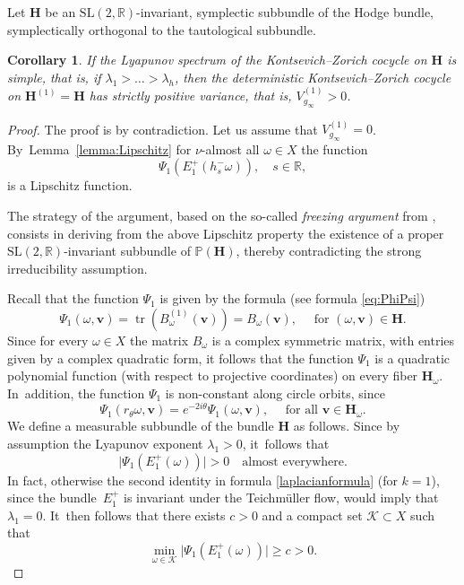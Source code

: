 \documentclass[10pt]{amsart}
\DeclareMathOperator{\tr}{tr}
\theoremstyle{plain}
\newtheorem{cor}[thm]{Corollary}
\theoremstyle{definition}
\numberwithin{equation}{subsection}
\newcommand\bP{\mathbb{P}}
\newcommand\bR{\mathbb{R}}\let\R\bR
\newcommand{\SL}{\mathrm{SL}}
\newcommand{\bfH}{\boldsymbol{H}}
\newcommand{\bfv}{\boldsymbol{v}}
\begin{document}
Let ${\bfH}$ be an
$\SL(2, \R)$-invariant, symplectic subbundle of the Hodge bundle, symplectically orthogonal to the tautological subbundle.

\begin{cor}\label{cor:freezing}
If the Lyapunov spectrum of the Kontsevich--Zorich cocycle on
$\bfH$ is simple, that is, if $\lambda_1> \dots >\lambda_h$,
then the deterministic Kontsevich--Zorich cocycle on ${\bfH}^{(1)}= {\bfH}$ has strictly positive variance, that is, $V^{(1)}_{g_\infty} > 0$.
\end{cor}

\begin{proof} The proof is by contradiction.
Let us assume that $V^{(1)}_{g_\infty}=0$. By~Lemma~\ref{lemma:Lipschitz} for $\nu$-almost all $\omega \in X$ the function
\[
\Psi_1 (E^+_1(h^-_s \omega)), \quad s \in \R,
\]
is a Lipschitz function.

The strategy of the argument, based on the so-called {\it freezing argument} from \cite{CF20}, consists in deriving from the above Lipschitz property the existence of a proper $\SL(2,\bR)$-invariant subbundle of $\bP({\bfH})$, thereby contradicting the strong irreducibility assumption.

Recall that the function $\Psi_1$ is given by
the formula (see formula \eqref{eq:PhiPsi})
\[
\Psi_1 (\omega, \bfv)= \tr(B^{(1)}_\omega(\bfv)) = B_\omega(\bfv),
\quad \text{ for } (\omega, {\bfv}) \in {\bfH}.
\]
Since for every $\omega \in X$ the matrix $B_\omega$ is a complex symmetric matrix, with
entries given by a complex quadratic form,
it follows that the function $\Psi_1$ is a quadratic polynomial function (with respect to projective coordinates) on every fiber ${\bfH}_\omega$. In~addition, the function $\Psi_1$ is non-constant along circle orbits, since
\[
\Psi_1 (r_{\theta}\omega, \bfv) =
e^{-2i \theta} \Psi_1 (\omega, \bfv), \quad \text{ for all } {\bfv} \in {\bfH}_\omega.
\]
We define a measurable subbundle of the bundle
${\bfH}$ as follows. Since by assumption the Lyapunov exponent
$\lambda_1 >0$, it~follows that
\[
\vert \Psi_1(E^+_1(\omega)) \vert >0 \quad \text{almost everywhere.}
\]
In fact, otherwise the second identity in formula \eqref{laplacianformula} (for $k=1$), since the bundle~$E^+_1$ is invariant under the Teichmüller flow, would imply that $\lambda_1=0$. It~then follows that there exists $c>0$ and a compact set $\mathcal K \subset X$ such that
\begin{equation}
\label{eq:norm_lbound}
\min_{\omega \in \mathcal{K}} \vert \Psi_1(E^+_1(\omega)) \vert \geq c>0.
\end{equation}


\end{proof}
\end{document}
